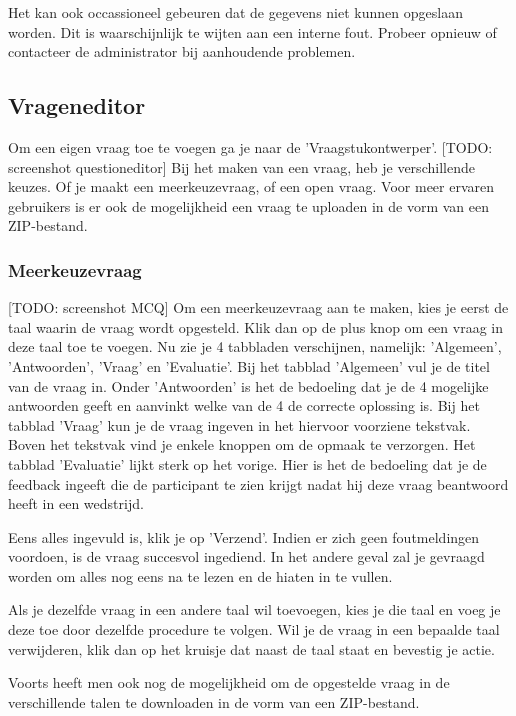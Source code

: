 \documentclass[]{article}
\begin{document}
Het kan ook occassioneel gebeuren dat de gegevens niet kunnen opgeslaan worden. Dit is waarschijnlijk te wijten aan een interne fout. Probeer opnieuw of contacteer de administrator bij aanhoudende problemen. 

\subsection{Vrageneditor}

Om een eigen vraag toe te voegen ga je naar de 'Vraagstukontwerper'. [TODO: screenshot questioneditor] Bij het maken van een vraag, heb je verschillende keuzes. Of je maakt een meerkeuzevraag, of een open vraag. Voor meer ervaren gebruikers is er ook de mogelijkheid een vraag te uploaden in de vorm van een ZIP-bestand.

\subsubsection{Meerkeuzevraag}

[TODO: screenshot MCQ] Om een meerkeuzevraag aan te maken, kies je eerst de taal waarin de vraag wordt opgesteld. Klik dan op de plus knop om een vraag in deze taal toe te voegen. Nu zie je 4 tabbladen verschijnen, namelijk: 'Algemeen', 'Antwoorden', 'Vraag' en 'Evaluatie'. Bij het tabblad 'Algemeen' vul je de titel van de vraag in. Onder 'Antwoorden' is het de bedoeling dat je de 4 mogelijke antwoorden geeft en aanvinkt welke van de 4 de correcte oplossing is. Bij het tabblad 'Vraag' kun je de vraag ingeven in het hiervoor voorziene tekstvak. Boven het tekstvak vind je enkele knoppen om de opmaak te verzorgen. Het tabblad 'Evaluatie' lijkt sterk op het vorige. Hier is het de bedoeling dat je de feedback ingeeft die de participant te zien krijgt nadat hij deze vraag beantwoord heeft in een wedstrijd. 

Eens alles ingevuld is, klik je op 'Verzend'. Indien er zich geen foutmeldingen voordoen, is de vraag succesvol ingediend. In het andere geval zal je gevraagd worden om alles nog eens na te lezen en de hiaten in te vullen.

Als je dezelfde vraag in een andere taal wil toevoegen, kies je die taal en voeg je deze toe door dezelfde procedure te volgen. Wil je de vraag in een bepaalde taal verwijderen, klik dan op het kruisje dat naast de taal staat en bevestig je actie. 

Voorts heeft men ook nog de mogelijkheid om de opgestelde vraag in de verschillende talen te downloaden in de vorm van een ZIP-bestand. 
\end{document}
